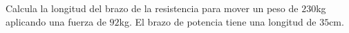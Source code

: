
\question Calcula la longitud del brazo de la resistencia para mover un peso
          de $230$kg aplicando una fuerza de $92$kg. El brazo de
          potencia tiene una longitud de $35$cm.

